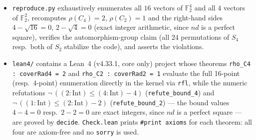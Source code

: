 \documentclass[11pt]{article}
\theoremstyle{definition}
\begin{document}
\begin{itemize}
\item \texttt{reproduce.py} exhaustively enumerates all $16$ vectors of
$\mathbb{F}_2^4$ and all $4$ vectors of $\mathbb{F}_2^2$, recomputes
$\rho(C_4) = 2$, $\rho(C_2) = 1$ and the right-hand sides
$4 - \sqrt{16} = 0$, $2 - \sqrt{4} = 0$ (exact integer arithmetic, since
$nd$ is a perfect square), verifies the automorphism-group claim
(all $24$ permutations of $S_4$ resp.\ both of $S_2$ stabilize the code),
and asserts the violations.
\item \texttt{lean4/} contains a Lean~4 (v4.33.1, core only) project whose
theorems \texttt{rho\_C4 : coverRad4 = 2} and \texttt{rho\_C2 : coverRad2 = 1}
evaluate the full 16-point (resp.\ 4-point) enumeration directly in the
kernel via \texttt{rfl}, while the numeric refutations
$\neg\, ((2{:}\mathrm{Int}) \le (4{:}\mathrm{Int}) - 4)$
(\texttt{refute\_bound\_4}) and
$\neg\, ((1{:}\mathrm{Int}) \le (2{:}\mathrm{Int}) - 2)$
(\texttt{refute\_bound\_2}) --- the bound values $4-4=0$ resp.\ $2-2=0$ are
exact integers, since $nd$ is a perfect square --- are proved by
\texttt{decide}. \texttt{Check.lean} prints \texttt{\#print axioms} for each
theorem: all four are axiom-free and no \texttt{sorry} is used.
\end{itemize}
\end{document}
